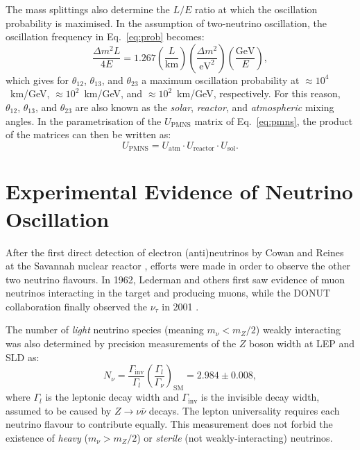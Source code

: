 The mass splittings also determine the $L/E$ ratio at which the oscillation probability is maximised. In the assumption of two-neutrino oscillation, the oscillation frequency in Eq.~\ref{eq:prob} becomes:
\begin{equation}
     \frac{\Delta m^{2}L}{4E} = 1.267\left(\frac{L}{\mathrm{km}}\right)\left(\frac{\Delta m^2}{\mathrm{eV}^2}\right)\left(\frac{\mathrm{GeV}}{E}\right),
\end{equation} 
which gives for $\theta_{12}$, $\theta_{13}$, and $\theta_{23}$ a maximum oscillation probability at $\approx 10^4$~km/GeV, $\approx 10^2$~km/GeV, and $\approx 10^2$~km/GeV, respectively. For this reason, $\theta_{12}$, $\theta_{13}$, and $\theta_{23}$ are also known as the \emph{solar}, \emph{reactor}, and \emph{atmospheric} mixing angles. In the parametrisation of the $U_{\mathrm{PMNS}}$ matrix of Eq.~\ref{eq:pmns}, the product of the matrices can then be written as:
\begin{equation}
    U_{\mathrm{PMNS}} = U_{\mathrm{atm}} \cdot U_{\mathrm{reactor}} \cdot U_{\mathrm{sol}}.
\end{equation}



\section{Experimental Evidence of Neutrino Oscillation}
After the first direct detection of electron (anti)neutrinos by Cowan and Reines at the Savannah nuclear reactor \cite{Cowan:1992xc}, efforts were made in order to observe the other two neutrino flavours.
In 1962, Lederman and others \cite{PhysRevLett.9.36} first saw evidence of muon neutrinos interacting in the target and producing muons, while the DONUT collaboration finally observed the $\nu_{\tau}$ in 2001 \cite{Kodama:2000mp}.

The number of \emph{light} neutrino species (meaning $m_{\nu} < m_{Z}/2$) weakly interacting was also determined by precision measurements of the $Z$ boson width at LEP and SLD \cite{ALEPH:2005ab} as:
\begin{equation}
   N_{\nu} = \frac{\Gamma_{\mathrm{inv}}}{\Gamma_l}
   \left(\frac{\Gamma_{l}}{\Gamma_{\nu}}\right)_{\mathrm{SM}}=2.984\pm0.008,
\end{equation}
where $\Gamma_{l}$ is the leptonic decay width and $\Gamma_{\mathrm{inv}}$ is the invisible decay width, assumed to be caused by $Z\rightarrow\nu\bar{\nu}$ decays. The lepton universality requires each neutrino flavour to contribute equally. This measurement does not forbid the existence of \emph{heavy} ($m_{\nu} > m_{Z}/2$) or \emph{sterile} (not weakly-interacting) neutrinos.

